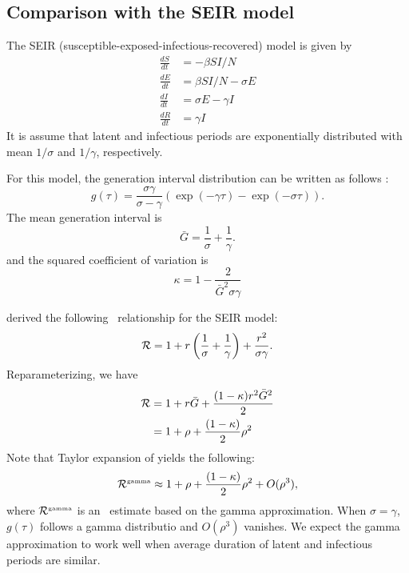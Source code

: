 
\subsection{Comparison with the SEIR model}

The SEIR (susceptible-exposed-infectious-recovered) model is given by
\begin{equation}
\begin{aligned}
\frac{dS}{dt} &= - \beta SI/N\\
\frac{dE}{dt} &= \beta SI/N - \sigma E\\
\frac{dI}{dt} &= \sigma E - \gamma I\\
\frac{dR}{dt} &= \gamma I
\end{aligned}
\end{equation}
It is assume that latent and infectious periods are exponentially distributed with mean $1/\sigma$ and $1/\gamma$, respectively.

For this model, the generation interval distribution can be written as follows \cite{Sven07}:
\begin{equation}
g({\tau}) = \frac{\sigma \gamma}{\sigma - \gamma} \left(\exp (-\gamma \tau) - \exp (- \sigma \tau) \right).
\end{equation}
The mean generation interval is
\begin{equation}
\bar{G} = \frac{1}{\sigma} + \frac{1}{\gamma}.
\end{equation}
and the squared coefficient of variation is
\begin{equation}
\kappa = 1 - \frac{2}{\bar{G}^2 \sigma \gamma}
\end{equation}

\cite{lipsitch2003transmission, roberts2007model} derived the following \rR\ relationship for the SEIR model:
\begin{equation}
{\cal R} = 1 + r\left(\frac{1}{\sigma} + \frac{1}{\gamma} \right) + \frac{r^2}{\sigma \gamma}.
\end{equation}
Reparameterizing, we have 
\begin{equation}
\begin{aligned}
{\cal R} &= 1 + r \bar{G} + \frac{(1-\kappa) r^2 {\bar{G}}^2}{2}\\
&= 1 + \rho + \frac{(1-\kappa)}{2} \rho^2
\end{aligned}
\end{equation}
Note that Taylor expansion of  yields the following:
\begin{equation}
{\cal R}^{{\textrm{\tiny gamma}}} \approx 1 + \rho + \frac{(1-\kappa)}{2} \rho^2 + O(\rho^3) \label{eq:taylor},
\end{equation}
where ${\cal R}^{{\textrm{\tiny gamma}}}$ is an \RR\ estimate based on the gamma approximation.
When $\sigma = \gamma$, $g(\tau)$ follows a gamma distributio and $O(\rho^3)$ vanishes.
We expect the gamma approximation to work well when average duration of latent and infectious periods are similar.

